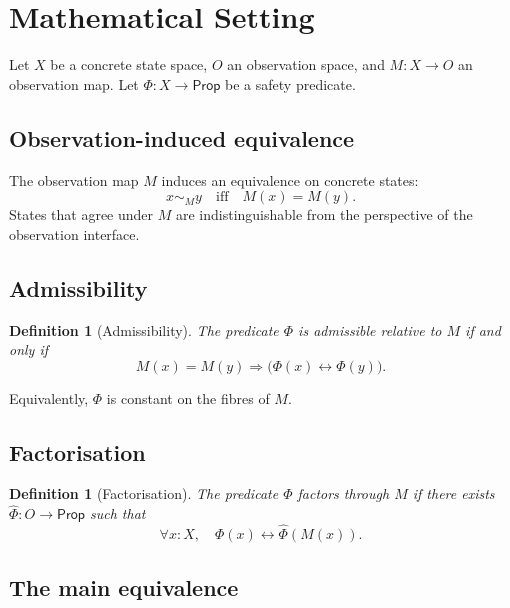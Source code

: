 \documentclass[a4paper,11pt]{article}
\newtheorem{definition}[theorem]{Definition}
\begin{document}
\section{Mathematical Setting}
\label{sec:setting}

Let \(X\) be a concrete state space, \(O\) an observation space, and
\(M : X \to O\) an observation map. Let \(\Phi : X \to \mathsf{Prop}\) be a
safety predicate.

\subsection{Observation-induced equivalence}

The observation map \(M\) induces an equivalence on concrete states:
\[
  x \sim_M y \quad\text{iff}\quad M(x) = M(y).
\]
States that agree under \(M\) are indistinguishable from the perspective of
the observation interface.

\subsection{Admissibility}

\begin{definition}[Admissibility]
\label{def:admissible}
The predicate \(\Phi\) is \emph{admissible} relative to \(M\) if and only if
\[
  M(x) = M(y) \Longrightarrow \bigl(\Phi(x) \leftrightarrow \Phi(y)\bigr).
\]
\end{definition}

Equivalently, \(\Phi\) is constant on the fibres of \(M\).

\subsection{Factorisation}

\begin{definition}[Factorisation]
\label{def:factorisation}
The predicate \(\Phi\) \emph{factors through} \(M\) if there exists
\(\widehat{\Phi} : O \to \mathsf{Prop}\) such that
\[
  \forall x : X,\quad \Phi(x) \leftrightarrow \widehat{\Phi}(M(x)).
\]
\end{definition}

\subsection{The main equivalence}
\end{document}
